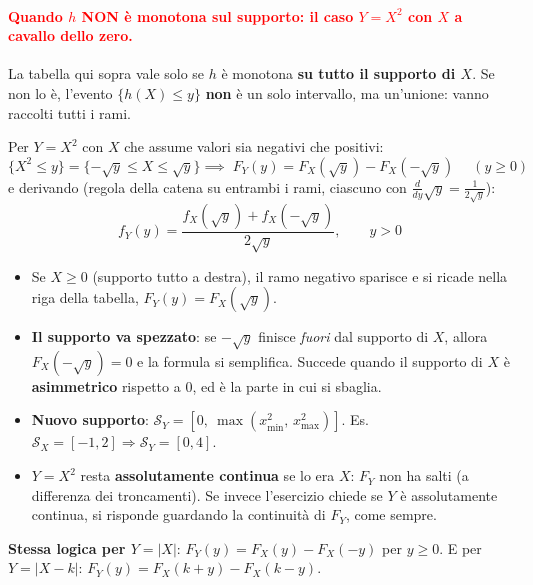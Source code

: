 \documentclass[12pt]{extarticle} %
\begin{document}
\paragraph{\textcolor{red}{Quando $h$ NON è monotona sul supporto: il caso $Y = X^2$ con $X$ a cavallo dello zero.}} La tabella qui sopra vale solo se $h$ è monotona \textbf{su tutto il supporto di $X$}. Se non lo è, l'evento $\{h(X) \le y\}$ \textbf{non} è un solo intervallo, ma un'unione: vanno raccolti tutti i rami.

\noindent Per $Y = X^2$ con $X$ che assume valori sia negativi che positivi:
$$ \{X^2 \le y\} = \{-\sqrt y \le X \le \sqrt y\} \implies \boxed{\;F_Y(y) = F_X(\sqrt y) - F_X(-\sqrt y)\;} \quad (y \ge 0) $$
e derivando (regola della catena su entrambi i rami, ciascuno con $\frac{d}{dy}\sqrt y = \frac{1}{2\sqrt y}$):
$$ f_Y(y) = \frac{f_X(\sqrt y) + f_X(-\sqrt y)}{2\sqrt y}, \qquad y > 0 $$
\begin{itemize}
    \item Se $X \ge 0$ (supporto tutto a destra), il ramo negativo sparisce e si ricade nella riga della tabella, $F_Y(y) = F_X(\sqrt y)$.
    \item \textbf{Il supporto va spezzato}: se $-\sqrt y$ finisce \emph{fuori} dal supporto di $X$, allora $F_X(-\sqrt y) = 0$ e la formula si semplifica. Succede quando il supporto di $X$ è \textbf{asimmetrico} rispetto a $0$, ed è la parte in cui si sbaglia.
    \item \textbf{Nuovo supporto}: $\mathcal{S}_Y = [0,\ \max(x_{\min}^2,\, x_{\max}^2)]$. {\footnotesize Es. $\mathcal{S}_X = [-1,2] \Rightarrow \mathcal{S}_Y = [0,4]$.}
    \item $Y = X^2$ resta \textbf{assolutamente continua} se lo era $X$: $F_Y$ non ha salti (a differenza dei troncamenti). {\footnotesize Se invece l'esercizio chiede se $Y$ è assolutamente continua, si risponde guardando la continuità di $F_Y$, come sempre.}
\end{itemize}
{\footnotesize \textbf{Stessa logica per $Y = |X|$}: $F_Y(y) = F_X(y) - F_X(-y)$ per $y \ge 0$. E per $Y = |X - k|$: $F_Y(y) = F_X(k+y) - F_X(k-y)$.}
\end{document}
